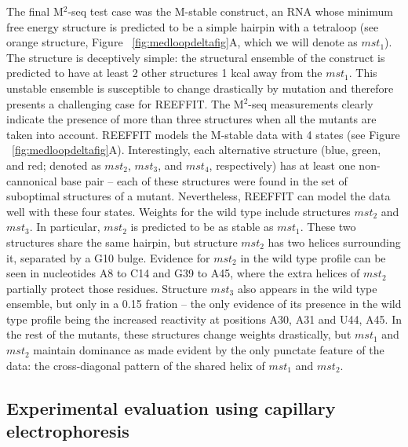 \documentclass[12pt]{article}
\begin{document}
The final M$^2$-seq test case was the M-stable construct, an RNA whose minimum free energy structure is predicted to be a simple hairpin with a tetraloop (see orange structure, Figure  ~\ref{fig:medloopdeltafig}A, which we will denote as $mst_1$). The structure is deceptively simple: the structural ensemble of the construct is predicted to have at least 2 other structures 1 kcal away from the $mst_1$. This unstable ensemble is susceptible to change drastically by mutation and therefore presents a challenging case for REEFFIT. The M$^2$-seq measurements clearly indicate the presence of more than three structures when all the mutants are taken into account. REEFFIT models the M-stable data with 4 states (see Figure ~\ref{fig:medloopdeltafig}A). Interestingly, each alternative structure (blue, green, and red; denoted as $mst_2$, $mst_3$, and $mst_4$, respectively) has at least one non-cannonical base pair -- each of these structures were found in the set of suboptimal structures of a mutant. Nevertheless, REEFFIT can model the data well with these four states. Weights for the wild type include structures $mst_2$ and $mst_3$. In particular, $mst_2$ is predicted to be as stable as $mst_1$. These two structures share the same hairpin, but structure $mst_2$ has two helices surrounding it, separated by a G10 bulge. Evidence for $mst_2$ in the wild type profile can be seen in nucleotides A8 to C14 and G39 to A45, where the extra helices of $mst_2$ partially protect those residues. Structure $mst_3$ also appears in the wild type ensemble, but only in a 0.15 fration -- the only evidence of its presence in the wild type profile being the increased reactivity at positions A30, A31 and U44, A45. In the rest of the mutants, these structures change weights drastically, but $mst_1$ and $mst_2$ maintain dominance as made evident by the only punctate feature of the data: the cross-diagonal pattern of the shared helix of $mst_1$ and $mst_2$.


\subsection{Experimental evaluation using capillary electrophoresis}
\end{document}
